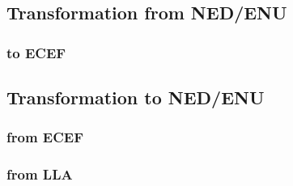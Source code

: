 \subsection{Transformation from NED/ENU}
\subsubsection*{to ECEF}



\subsection{Transformation to NED/ENU}
\subsubsection*{from ECEF}


\subsubsection*{from LLA}
